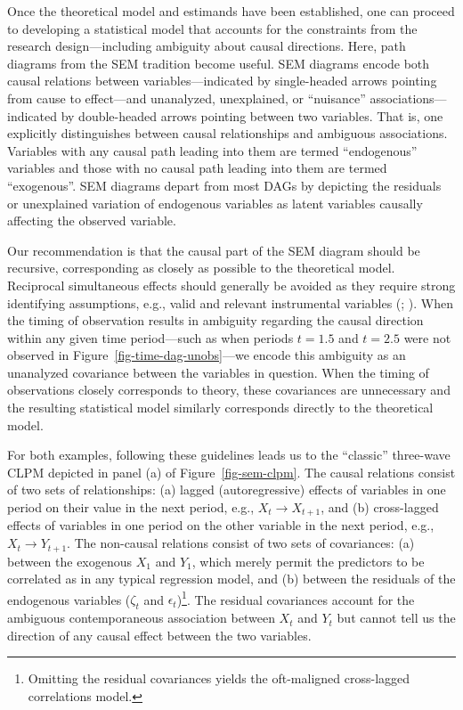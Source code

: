 \documentclass[
  letterpaper,
  DIV=11,
  numbers=noendperiod]{scrartcl}
\begin{document}
Once the theoretical model and estimands have been established, one can
proceed to developing a statistical model that accounts for the
constraints from the research design---including ambiguity about causal
directions. Here, path diagrams from the SEM tradition become useful.
SEM diagrams encode both causal relations between variables---indicated
by single-headed arrows pointing from cause to effect---and unanalyzed,
unexplained, or ``nuisance'' associations---indicated by double-headed
arrows pointing between two variables. That is, one explicitly
distinguishes between causal relationships and ambiguous associations.
Variables with any causal path leading into them are termed
``endogenous'' variables and those with no causal path leading into them
are termed ``exogenous''. SEM diagrams depart from most DAGs by
depicting the residuals or unexplained variation of endogenous variables
as latent variables causally affecting the observed variable.

Our recommendation is that the causal part of the SEM diagram should be
recursive, corresponding as closely as possible to the theoretical
model. Reciprocal simultaneous effects should generally be avoided as
they require strong identifying assumptions, e.g., valid and relevant
instrumental variables
(;
). When the timing
of observation results in ambiguity regarding the causal direction
within any given time period---such as when periods \(t=1.5\) and
\(t=2.5\) were not observed in Figure~\ref{fig-time-dag-unobs}---we
encode this ambiguity as an unanalyzed covariance between the variables
in question. When the timing of observations closely corresponds to
theory, these covariances are unnecessary and the resulting statistical
model similarly corresponds directly to the theoretical model.

For both examples, following these guidelines leads us to the
``classic'' three-wave CLPM depicted in panel (a) of
Figure~\ref{fig-sem-clpm}. The causal relations consist of two sets of
relationships: (a) lagged (autoregressive) effects of variables in one
period on their value in the next period, e.g.,
\(X_{t} \rightarrow X_{t+1}\), and (b) cross-lagged effects of variables
in one period on the other variable in the next period, e.g.,
\(X_{t} \rightarrow Y_{t+1}\). The non-causal relations consist of two
sets of covariances: (a) between the exogenous \(X_1\) and \(Y_1\),
which merely permit the predictors to be correlated as in any typical
regression model, and (b) between the residuals of the endogenous
variables (\(\zeta_t\) and \(\epsilon_t\))\footnote{Omitting the
  residual covariances yields the oft-maligned cross-lagged correlations
  model.}. The residual covariances account for the ambiguous
contemporaneous association between \(X_t\) and \(Y_t\) but cannot tell
us the direction of any causal effect between the two variables.
\end{document}
